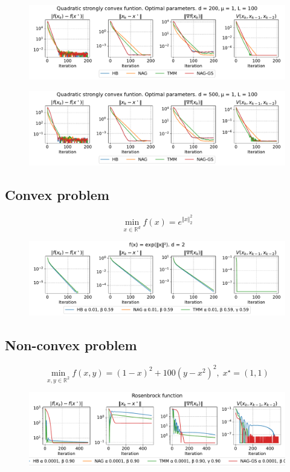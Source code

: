 \documentclass[a4paper,11pt]{article}
\begin{document}
\begin{figure}[h!]
 \centering
 \includegraphics[width=\linewidth]{quad_simple_optimal_200_100.pdf}
\end{figure}

\begin{figure}[h!]
 \centering
 \includegraphics[width=\linewidth]{quad_simple_optimal_500_100.pdf}
\end{figure}

\subsection{Convex problem}
$$
\min\limits_{x \in \mathbb{R}^d} f(x) = e^{\Vert x\Vert ^2_2}
$$

\begin{figure}[h!]
 \centering
 \includegraphics[width=\linewidth]{conv.pdf}
\end{figure}

\subsection{Non-convex problem}

$$
\min\limits_{x,y \in \mathbb{R}^2} f(x, y) = (1 - x)^2 + 100(y - x^2)^2, \; x^\star = (1, 1)
$$

\begin{figure}[h!]
 \centering
 \includegraphics[width=\linewidth]{non_conv.pdf}
\end{figure}
\end{document}
